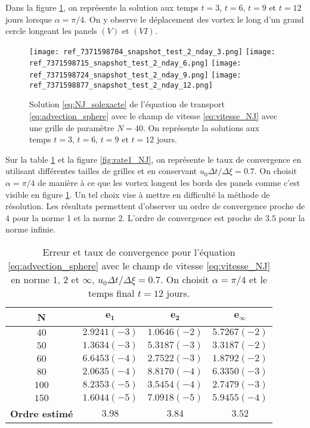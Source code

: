 Dans la figure \ref{fig:NJ_difftps}, on représente la solution aux temps $t=3$, $t=6$, $t=9$ et $t=12$ jours lorsque $\alpha = \pi/4$. On y observe le déplacement des vortex le long d'un grand cercle longeant les panels $(V)$ et $(VI)$.

\begin{figure}[htbp]
\begin{center}
\texttt{[image: ref\_7371598704\_snapshot\_test\_2\_nday\_3.png]}
\texttt{[image: ref\_7371598715\_snapshot\_test\_2\_nday\_6.png]}
\texttt{[image: ref\_7371598724\_snapshot\_test\_2\_nday\_9.png]}
\texttt{[image: ref\_7371598877\_snapshot\_test\_2\_nday\_12.png]}
\end{center}
\caption{Solution \eqref{eq:NJ_solexacte} de l'équation de transport \eqref{eq:advection_sphere} avec le champ de vitesse \eqref{eq:vitesse_NJ} avec une grille de paramètre $N=40$. On représente la solutions aux temps $t=3$, $t=6$, $t=9$ et $t=12$ jours.}
\label{fig:NJ_difftps} 
\end{figure}

Sur la table \ref{tab:rate1_NJ} et la figure \ref{fig:rate1_NJ}, on représente le taux de convergence en utilisant différentes tailles de grilles et en conservant $u_0 \Delta t / \Delta \xi = 0.7$. On choisit $\alpha = \pi/4$ de manière à ce que les vortex longent les bords des panels comme c'est visible en figure \ref{fig:NJ_difftps}. Un tel choix vise à mettre en difficulté la méthode de résolution. Les résultats permettent d'observer un ordre de convergence proche de $4$ pour la norme 1 et la norme 2. L'ordre de convergence est proche de $3.5$ pour la norme infinie. 

\begin{table}[htbp]
\begin{center}
\begin{tabular}{|c||c|c|c|}
\hline
\textbf{N}  & $\mathbf{e_1}$ & $\mathbf{e_2}$ & $\mathbf{e_{\infty}}$\\
\hline
\hline
$40$  & $2.9241 (-3)$ & $1.0646 (-2)$ & $5.7267 (-2)$ \\
$50$  & $1.3634 (-3)$ & $5.3187 (-3)$ & $3.3187 (-2)$ \\
$60$  & $6.6453 (-4)$ & $2.7522 (-3)$ & $1.8792 (-2)$ \\
$80$  & $2.0635 (-4)$ & $8.8170 (-4)$ & $6.3350 (-3)$ \\
$100$ & $8.2353 (-5)$ & $3.5454 (-4)$ & $2.7479 (-3)$ \\
$150$ & $1.6044 (-5)$ & $7.0918 (-5)$ & $5.9455 (-4)$ \\
\hline 
\hline
\textbf{Ordre estimé}& $3.98$ & $3.84$ & $3.52$\\
\hline
\end{tabular}
\end{center}
\caption{Erreur et taux de convergence pour l'équation \eqref{eq:advection_sphere} avec le champ de vitesse \eqref{eq:vitesse_NJ} en norme $1$, $2$ et $\infty$, $u_0 \Delta t / \Delta \xi = 0.7$. On choisit $\alpha = \pi/4$ et le temps final $t=12$ jours.}
\label{tab:rate1_NJ}
\end{table} 

